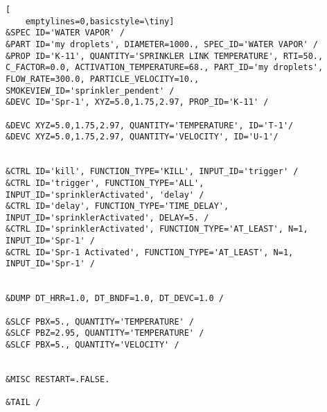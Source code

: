 \begin{lstlisting}[
    emptylines=0,basicstyle=\tiny]
&SPEC ID='WATER VAPOR' /
&PART ID='my droplets', DIAMETER=1000., SPEC_ID='WATER VAPOR' /
&PROP ID='K-11', QUANTITY='SPRINKLER LINK TEMPERATURE', RTI=50., C_FACTOR=0.0, ACTIVATION_TEMPERATURE=68., PART_ID='my droplets', FLOW_RATE=300.0, PARTICLE_VELOCITY=10., SMOKEVIEW_ID='sprinkler_pendent' /
&DEVC ID='Spr-1', XYZ=5.0,1.75,2.97, PROP_ID='K-11' /

&DEVC XYZ=5.0,1.75,2.97, QUANTITY='TEMPERATURE', ID='T-1'/
&DEVC XYZ=5.0,1.75,2.97, QUANTITY='VELOCITY', ID='U-1'/


&CTRL ID='kill', FUNCTION_TYPE='KILL', INPUT_ID='trigger' /
&CTRL ID='trigger', FUNCTION_TYPE='ALL', INPUT_ID='sprinklerActivated', 'delay' /
&CTRL ID='delay', FUNCTION_TYPE='TIME_DELAY', INPUT_ID='sprinklerActivated', DELAY=5. /
&CTRL ID='sprinklerActivated', FUNCTION_TYPE='AT_LEAST', N=1, INPUT_ID='Spr-1' /
&CTRL ID='Spr-1 Activated', FUNCTION_TYPE='AT_LEAST', N=1, INPUT_ID='Spr-1' /


&DUMP DT_HRR=1.0, DT_BNDF=1.0, DT_DEVC=1.0 /

&SLCF PBX=5., QUANTITY='TEMPERATURE' /
&SLCF PBZ=2.95, QUANTITY='TEMPERATURE' /
&SLCF PBX=5., QUANTITY='VELOCITY' /


&MISC RESTART=.FALSE.

&TAIL /

    
\end{lstlisting}
